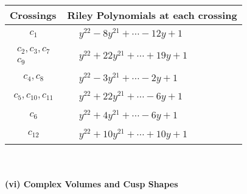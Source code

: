 \documentclass[1p]{elsarticle_modified}
\theoremstyle{definition}
\begin{document}
\begin{tabular}{m{50pt}|m{274pt}}
Crossings & \hspace{64pt}Riley Polynomials at each crossing \\
\hline $$\begin{aligned}c_{1}\end{aligned}$$&$\begin{aligned}
&y^{22}-8 y^{21}+\cdots-12 y+1
\end{aligned}$\\
\hline $$\begin{aligned}c_{2},c_{3},c_{7}\\c_{9}\end{aligned}$$&$\begin{aligned}
&y^{22}+22 y^{21}+\cdots+19 y+1
\end{aligned}$\\
\hline $$\begin{aligned}c_{4},c_{8}\end{aligned}$$&$\begin{aligned}
&y^{22}-3 y^{21}+\cdots-2 y+1
\end{aligned}$\\
\hline $$\begin{aligned}c_{5},c_{10},c_{11}\end{aligned}$$&$\begin{aligned}
&y^{22}+22 y^{21}+\cdots-6 y+1
\end{aligned}$\\
\hline $$\begin{aligned}c_{6}\end{aligned}$$&$\begin{aligned}
&y^{22}+4 y^{21}+\cdots-6 y+1
\end{aligned}$\\
\hline $$\begin{aligned}c_{12}\end{aligned}$$&$\begin{aligned}
&y^{22}+10 y^{21}+\cdots+10 y+1
\end{aligned}$\\
\hline
\end{tabular}\\~\\
\newpage\flushleft \textbf{(vi) Complex Volumes and Cusp Shapes}
\end{document}
